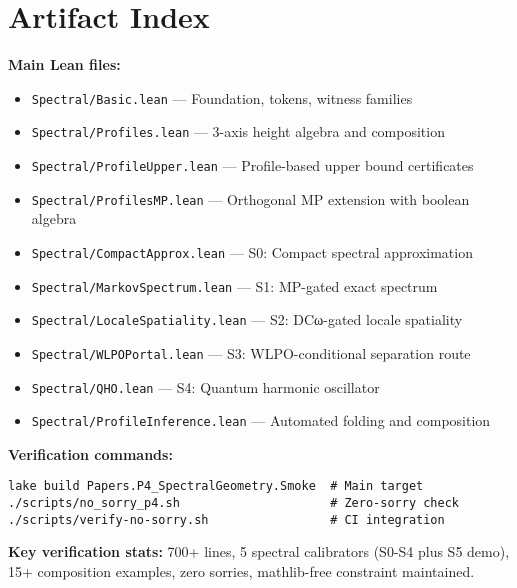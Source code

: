 \documentclass[11pt]{article}
\newcommand{\lean}[1]{\texttt{#1}}
\theoremstyle{plain}
\theoremstyle{definition}
\theoremstyle{remark}
\begin{document}
\appendix
\section{Artifact Index}

\textbf{Main Lean files:}
\begin{itemize}[noitemsep]
\item \lean{Spectral/Basic.lean} — Foundation, tokens, witness families
\item \lean{Spectral/Profiles.lean} — 3-axis height algebra and composition  
\item \lean{Spectral/ProfileUpper.lean} — Profile-based upper bound certificates
\item \lean{Spectral/ProfilesMP.lean} — Orthogonal MP extension with boolean algebra
\item \lean{Spectral/CompactApprox.lean} — S0: Compact spectral approximation
\item \lean{Spectral/MarkovSpectrum.lean} — S1: MP-gated exact spectrum
\item \lean{Spectral/LocaleSpatiality.lean} — S2: DCω-gated locale spatiality  
\item \lean{Spectral/WLPOPortal.lean} — S3: WLPO-conditional separation route
\item \lean{Spectral/QHO.lean} — S4: Quantum harmonic oscillator
\item \lean{Spectral/ProfileInference.lean} — Automated folding and composition
\end{itemize}

\textbf{Verification commands:}
\begin{verbatim}
lake build Papers.P4_SpectralGeometry.Smoke  # Main target
./scripts/no_sorry_p4.sh                     # Zero-sorry check
./scripts/verify-no-sorry.sh                 # CI integration
\end{verbatim}

\textbf{Key verification stats:} 700+ lines, 5 spectral calibrators (S0-S4 plus S5 demo), 15+ composition examples, zero sorries, mathlib-free constraint maintained.

\end{document}
